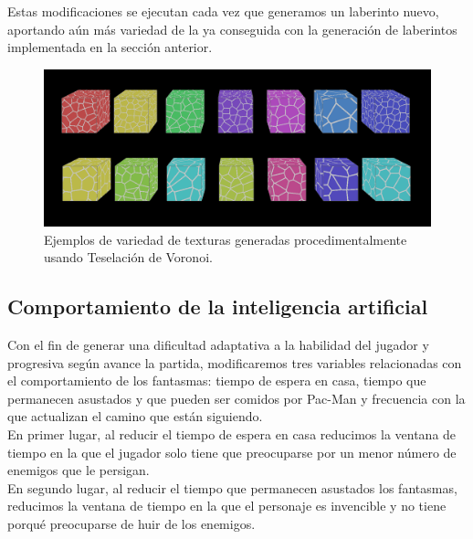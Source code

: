 Estas modificaciones se ejecutan cada vez que generamos un laberinto nuevo, aportando aún más variedad de la ya conseguida con la generación de laberintos implementada en la sección anterior.\\

\begin{figure}[H]
    \begin{center}
        \includegraphics[scale=0.275]{img/texturas.png}
        \caption{Ejemplos de variedad de texturas generadas procedimentalmente usando Teselación de Voronoi.}
    \end{center}
\end{figure}


\newpage

\subsection{Comportamiento de la inteligencia artificial}

Con el fin de generar una dificultad adaptativa a la habilidad del jugador y progresiva según avance la partida, modificaremos tres variables relacionadas con el comportamiento de los fantasmas: tiempo de espera en casa, tiempo que permanecen asustados y que pueden ser comidos por Pac-Man y frecuencia con la que actualizan el camino que están siguiendo.\\

En primer lugar, al reducir el tiempo de espera en casa reducimos la ventana de tiempo en la que el jugador solo tiene que preocuparse por un menor número de enemigos que le persigan.\\

En segundo lugar, al reducir el tiempo que permanecen asustados los fantasmas, reducimos la ventana de tiempo en la que el personaje es invencible y no tiene porqué preocuparse de huir de los enemigos.\\

